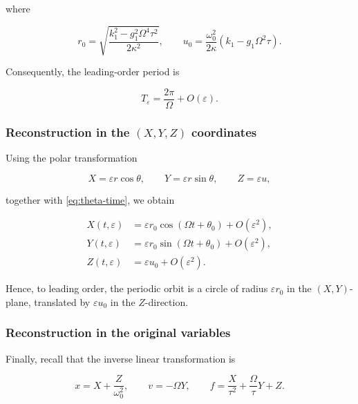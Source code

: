 \documentclass[11pt,reqno]{amsart}
\theoremstyle{plain}
\theoremstyle{definition}
\theoremstyle{remark}
\begin{document}
where

\[
r_0
=
\sqrt{
\frac{
k_1^2-g_1^2\Omega^4\tau^2
}
{2\kappa^2}
},
\qquad
u_0
=
\frac{\omega_0^2}{2\kappa}
\left(
k_1-g_1\Omega^2\tau
\right).
\]

Consequently, the leading-order period is

\begin{equation}
\label{eq:period}
\boxed{
T_\varepsilon
=
\frac{2\pi}{\Omega}
+
O(\varepsilon).
}
\end{equation}


\subsubsection*{Reconstruction in the $(X,Y,Z)$ coordinates}

Using the polar transformation

\[
X=\varepsilon r\cos\theta,
\qquad
Y=\varepsilon r\sin\theta,
\qquad
Z=\varepsilon u,
\]

together with \eqref{eq:theta-time}, we obtain

\begin{equation}
\label{eq:XYZ-periodic}
\boxed{
\begin{aligned}
X(t,\varepsilon)
&=
\varepsilon r_0\cos(\Omega t+\theta_0)
+
O(\varepsilon^2),
\\[2mm]
Y(t,\varepsilon)
&=
\varepsilon r_0\sin(\Omega t+\theta_0)
+
O(\varepsilon^2),
\\[2mm]
Z(t,\varepsilon)
&=
\varepsilon u_0
+
O(\varepsilon^2).
\end{aligned}}
\end{equation}

Hence, to leading order, the periodic orbit is a circle of radius
$\varepsilon r_0$ in the $(X,Y)$-plane, translated by
$\varepsilon u_0$ in the $Z$-direction.


\subsubsection*{Reconstruction in the original variables}

Finally, recall that the inverse linear transformation is

\[
x
=
X+\frac{Z}{\omega_0^2},
\qquad
v
=
-\Omega Y,
\qquad
f
=
\frac{X}{\tau^2}
+\frac{\Omega}{\tau}Y
+Z.
\]
\end{document}
